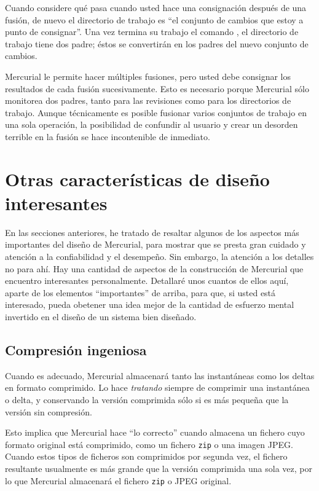 Cuando considere qué pasa cuando usted hace una consignación después
de una fusión, de nuevo el directorio de trabajo es ``el conjunto de
cambios que estoy a punto de consignar''. Una vez termina su trabajo
el comando , el directorio de trabajo tiene dos padre;
éstos se convertirán en los padres del nuevo conjunto de cambios.

Mercurial le permite hacer múltiples fusiones, pero usted debe
consignar los resultados de cada fusión sucesivamente. Esto es
necesario porque Mercurial sólo monitorea dos padres, tanto para las
revisiones como para los directorios de trabajo. Aunque técnicamente
es posible fusionar varios conjuntos de trabajo en una sola operación,
la posibilidad de confundir al usuario y crear un desorden terrible en
la fusión se hace incontenible de inmediato.

\section{Otras características de diseño interesantes}

En las secciones anteriores, he tratado de resaltar algunos de los
aspectos más importantes del diseño de Mercurial, para mostrar que se
presta gran cuidado y atención a la confiabilidad y el desempeño. Sin
embargo, la atención a los detalles no para ahí. Hay una cantidad de
aspectos de la construcción de Mercurial que encuentro interesantes
personalmente. Detallaré unos cuantos de ellos aquí, aparte de los
elementos ``importantes'' de arriba, para que, si usted está
interesado, pueda obetener una idea mejor de la cantidad de esfuerzo
mental invertido en el diseño de un sistema bien diseñado.


\subsection{Compresión ingeniosa}

Cuando es adecuado, Mercurial almacenará tanto las instantáneas como
los deltas en formato comprimido. Lo hace \emph{tratando} siempre de
comprimir una instantánea o delta, y conservando la versión comprimida
sólo si es más pequeña que la versión sin compresión.

Esto implica que Mercurial hace ``lo correcto'' cuando almacena un
fichero cuyo formato original está comprimido, como un fichero
\texttt{zip} o una imagen JPEG.  Cuando estos tipos de ficheros son
comprimidos por segunda vez, el fichero resultante usualmente es más
grande que la versión comprimida una sola vez, por lo que Mercurial
almacenará el fichero \texttt{zip} o JPEG original.

